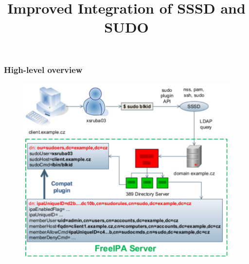 \documentclass[pdftex,unicode,xcolor=table]{beamer}
\title{Improved Integration of SSSD and SUDO}
\institute{Michal Šrubař}
\date{}
\begin{document}
 {
    \maketitle
    \newpage
}


 {
    \begin{rhbg}
    \begin{frame}
        \titlepage
    \end{frame}
    \end{rhbg}
}

\begin{frame}
    \frametitle{High-level overview}
    \begin{figure}
        \includegraphics[scale=0.58]{img/1.pdf}
    \end{figure}
\end{frame}
\end{document}

